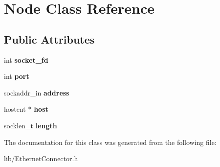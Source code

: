 \hypertarget{class_node}{\section{Node Class Reference}
\label{class_node}
}
\subsection*{Public Attributes}
\begin{DoxyCompactItemize}
\item 
\hypertarget{class_node_a67540d6c1bdb61b9c13dc979a4b757bf}{int {\bfseries socket\+\_\+fd}}\label{class_node_a67540d6c1bdb61b9c13dc979a4b757bf}

\item 
\hypertarget{class_node_a6196d93a8552148cb493c37f10835d08}{int {\bfseries port}}\label{class_node_a6196d93a8552148cb493c37f10835d08}

\item 
\hypertarget{class_node_a2a115bcf49355f96fd05aae958a2b021}{sockaddr\+\_\+in {\bfseries address}}\label{class_node_a2a115bcf49355f96fd05aae958a2b021}

\item 
\hypertarget{class_node_aa4193fd5f7b5ab2b94a3c0871a43d05a}{hostent $\ast$ {\bfseries host}}\label{class_node_aa4193fd5f7b5ab2b94a3c0871a43d05a}

\item 
\hypertarget{class_node_a5e2f63399d08e84bd278c03b4be6903b}{socklen\+\_\+t {\bfseries length}}\label{class_node_a5e2f63399d08e84bd278c03b4be6903b}

\end{DoxyCompactItemize}


The documentation for this class was generated from the following file\+:\begin{DoxyCompactItemize}
\item 
lib/Ethernet\+Connector.\+h\end{DoxyCompactItemize}
